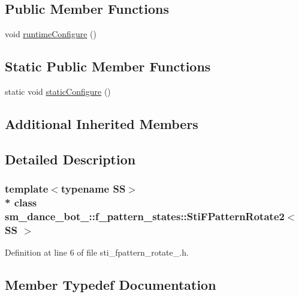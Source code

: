 \subsection*{Public Member Functions}
\begin{DoxyCompactItemize}
\item 
void \hyperlink{structsm__dance__bot__3_1_1f__pattern__states_1_1StiFPatternRotate2_a2e30ce30477a7bedc9b1c199408829fb}{runtime\+Configure} ()
\end{DoxyCompactItemize}
\subsection*{Static Public Member Functions}
\begin{DoxyCompactItemize}
\item 
static void \hyperlink{structsm__dance__bot__3_1_1f__pattern__states_1_1StiFPatternRotate2_a0d70f5fd73727baacdf868dc19faf10c}{static\+Configure} ()
\end{DoxyCompactItemize}
\subsection*{Additional Inherited Members}


\subsection{Detailed Description}
\subsubsection*{template$<$typename SS$>$\\*
class sm\+\_\+dance\+\_\+bot\+\_\+::f\+\_\+pattern\+\_\+states\+::\+Sti\+F\+Pattern\+Rotate2$<$ S\+S $>$}



Definition at line 6 of file sti\+\_\+fpattern\+\_\+rotate\+\_.\+h.



\subsection{Member Typedef Documentation}
